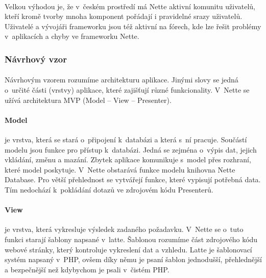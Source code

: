 \documentclass[11pt,a4paper,titlepage,oneside]{book}
\begin{document}
			\paragraph{} Velkou výhodou je, že v~českém prostředí má Nette aktivní komunitu uživatelů, kteří kromě tvorby mnoha komponent pořádají i pravidelné srazy uživatelů.  Uživatelé a vývojáři frameworku jsou též aktivní na fórech, kde lze řešit problémy v~aplikacích a chyby ve frameworku Nette.
			\subsubsection*{Návrhový vzor}
				\paragraph{} Návrhovým vzorem rozumíme architekturu aplikace. Jinými slovy se jedná o~určité části (vrstvy) aplikace, které zajišťují různé funkcionality. V~Nette se užívá architektura MVP (Model -- View -- Presenter).



				\paragraph{Model} je vrstva, která se stará o~připojení k~databázi a která s~ní pracuje. Součástí modelu jsou funkce pro přístup k~databázi. Jedná se zejména o~výpis dat, jejich vkládání, změnu a mazání. Zbytek aplikace komunikuje s~model přes rozhraní, které model poskytuje. V~Nette obstarává funkce modelu knihovna Nette Database. Pro větší přehlednost se vytvářejí funkce, které vypisují potřebná data. Tím nedochází k~pokládání dotazů ve zdrojovém kódu Presenterů.




				\paragraph{View} je vrstva, která vykresluje výsledek zadaného požadavku. V~Nette se o~tuto funkci starají šablony napsané v~latte. Šablonou rozumíme část zdrojového kódu webové stránky, který kontroluje vykreslení dat a vzhledu. Latte je šablonovací systém napsaný v~\ac{PHP}, ovšem díky němu je psaní šablon jednodušší, přehlednější a bezpečnější než kdybychom je psali v~čistém PHP.
\end{document}
